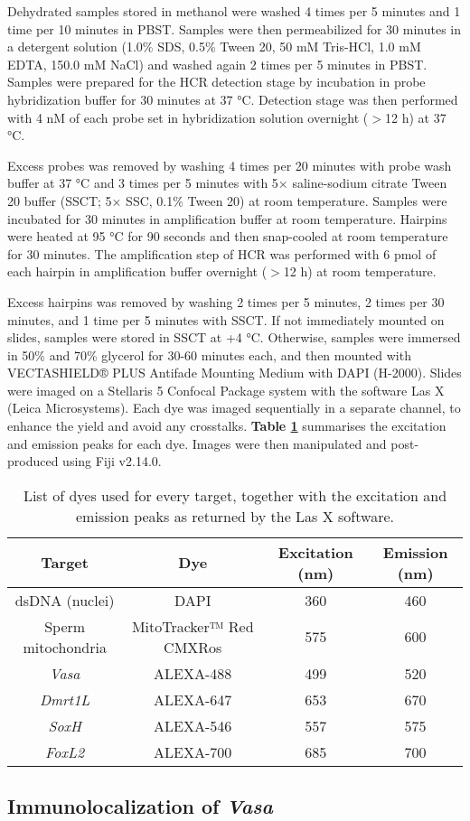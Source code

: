 \documentclass[../main.tex]{subfiles}
\begin{document}
Dehydrated samples stored in methanol were washed 4 times per 5 minutes and 1 time per 10 minutes in PBST. Samples were then permeabilized for 30 minutes in a detergent solution (1.0\% SDS, 0.5\% Tween 20, 50 mM Tris-HCl, 1.0 mM EDTA, 150.0 mM NaCl) and washed again 2 times per 5 minutes in PBST. Samples were prepared for the HCR detection stage by incubation in probe hybridization buffer for 30 minutes at 37 °C. Detection stage was then performed with 4 nM of each probe set in hybridization solution overnight ($>$12 h) at 37 °C.

Excess probes was removed by washing 4 times per 20 minutes with probe wash buffer at 37 °C and 3 times per 5 minutes with 5× saline-sodium citrate Tween 20 buffer (SSCT; 5× SSC, 0.1\% Tween 20) at room temperature. Samples were incubated for 30 minutes in amplification buffer at room temperature. Hairpins were heated at 95 °C for 90 seconds and then snap-cooled at room temperature for 30 minutes. The amplification step of HCR was performed with 6 pmol of each hairpin in amplification buffer overnight ($>$12 h) at room temperature.

Excess hairpins was removed by washing 2 times per 5 minutes, 2 times per 30 minutes, and 1 time per 5 minutes with SSCT. If not immediately mounted on slides, samples were stored in SSCT at +4 °C. Otherwise, samples were immersed in 50\% and 70\% glycerol for 30-60 minutes each, and then mounted with VECTASHIELD® PLUS Antifade Mounting Medium with DAPI (H-2000). Slides were imaged on a Stellaris 5 Confocal Package system with the software Las X (Leica Microsystems). Each dye was imaged sequentially in a separate channel, to enhance the yield and avoid any crosstalks. \textbf{Table \ref{tab:imaging}} summarises the excitation and emission peaks for each dye. Images were then manipulated and post-produced using Fiji v2.14.0.

\begin{table}
    \centering
    \begin{tabular}{c c c c}
         \hline
         \textbf{Target} & \textbf{Dye} & \textbf{Excitation (nm)} & \textbf{Emission (nm)} \\
         \hline
         dsDNA (nuclei) & DAPI & 360 & 460 \\
         Sperm mitochondria & MitoTracker™ Red CMXRos & 575 & 600 \\
         \textit{Vasa} & ALEXA-488 & 499 & 520 \\
         \textit{Dmrt1L} & ALEXA-647 & 653 & 670 \\
         \textit{SoxH} & ALEXA-546 & 557 & 575 \\
         \textit{FoxL2} & ALEXA-700 & 685 & 700 \\
         \hline
    \end{tabular}
    \caption{List of dyes used for every target, together with the excitation and emission peaks as returned by the Las X software.}
    \label{tab:imaging}
\end{table}

\subsection{Immunolocalization of \textit{Vasa}}
\end{document}
